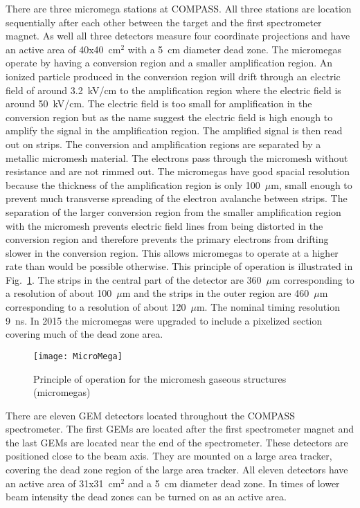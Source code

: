 There are three micromega stations at COMPASS.  All three stations are location
sequentially after each other between the target and the first spectrometer
magnet.  As well all three detectors measure four coordinate projections and
have an active area of 40x40~cm$^2$ with a 5~cm diameter dead zone.  The
micromegas operate by having a conversion region and a smaller amplification
region.  An ionized particle produced in the conversion region will drift
through an electric field of around 3.2~kV/cm to the amplification region where
the electric field is around 50~kV/cm.  The electric field is too small for
amplification in the conversion region but as the name suggest the electric
field is high enough to amplify the signal in the amplification region.  The
amplified signal is then read out on strips.  The conversion and amplification
regions are separated by a metallic micromesh material.  The electrons pass
through the micromesh without resistance and are not rimmed out.  The micromegas
have good spacial resolution because the thickness of the amplification region
is only 100~$\mu$m, small enough to prevent much transverse spreading of the
electron avalanche between strips.  The separation of the larger conversion
region from the smaller amplification region with the micromesh prevents
electric field lines from being distorted in the conversion region and therefore
prevents the primary electrons from drifting slower in the conversion region.
This allows micromegas to operate at a higher rate than would be possible
otherwise.  This principle of operation is illustrated in
Fig.~\ref{fig::MicroMega}.  The strips in the central part of the detector are
360~$\mu$m corresponding to a resolution of about 100~$\mu$m and the strips in
the outer region are 460~$\mu$m corresponding to a resolution of about
120~$\mu$m.  The nominal timing resolution 9~ns.  In 2015 the micromegas were
upgraded to include a pixelized section covering much of the dead zone
area. \par

\begin{figure}[h!t]
  \centering
  \texttt{[image: MicroMega]}
  \caption{Principle of operation for the micromesh gaseous structures
    (micromegas)}
  \label{fig::MicroMega}
\end{figure}

There are eleven GEM detectors located throughout the COMPASS spectrometer.  The
first GEMs are located after the first spectrometer magnet and the last GEMs are
located near the end of the spectrometer.  These detectors are positioned close
to the beam axis.  They are mounted on a large area tracker, covering the dead
zone region of the large area tracker.  All eleven detectors have an active area
of 31x31~cm$^2$ and a 5~cm diameter dead zone.  In times of lower beam intensity
the dead zones can be turned on as an active area.  \par

